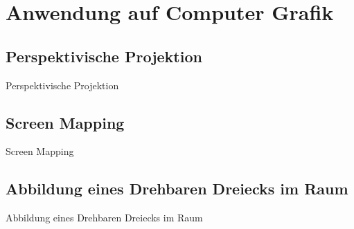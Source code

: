 \documentclass[10pt,aspectratio=169]{beamer}
\begin{document}
  \section{Anwendung auf Computer Grafik}


  \subsection{Perspektivische Projektion}
  \begin{frame}{Perspektivische Projektion}
  \end{frame}


  \subsection{Screen Mapping}
  \begin{frame}{Screen Mapping}
  \end{frame}

  \subsection{Abbildung eines Drehbaren Dreiecks im Raum}
  \begin{frame}{Abbildung eines Drehbaren Dreiecks im Raum}
  \end{frame}
\end{document}
